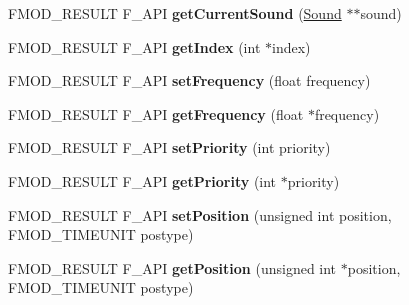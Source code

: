 \begin{DoxyCompactItemize}
\item 
\hypertarget{class_f_m_o_d_1_1_channel_af8c6cb4f1490eda077f4a661437a0809}{F\+M\+O\+D\+\_\+\+R\+E\+S\+U\+L\+T F\+\_\+\+A\+P\+I {\bfseries get\+Current\+Sound} (\hyperlink{class_f_m_o_d_1_1_sound}{Sound} $\ast$$\ast$sound)}\label{class_f_m_o_d_1_1_channel_af8c6cb4f1490eda077f4a661437a0809}

\item 
\hypertarget{class_f_m_o_d_1_1_channel_ad1d410d1d16d0c153dd0af5de8fda88e}{F\+M\+O\+D\+\_\+\+R\+E\+S\+U\+L\+T F\+\_\+\+A\+P\+I {\bfseries get\+Index} (int $\ast$index)}\label{class_f_m_o_d_1_1_channel_ad1d410d1d16d0c153dd0af5de8fda88e}

\item 
\hypertarget{class_f_m_o_d_1_1_channel_a355cd052a405c0ecdbaac7c65d24148b}{F\+M\+O\+D\+\_\+\+R\+E\+S\+U\+L\+T F\+\_\+\+A\+P\+I {\bfseries set\+Frequency} (float frequency)}\label{class_f_m_o_d_1_1_channel_a355cd052a405c0ecdbaac7c65d24148b}

\item 
\hypertarget{class_f_m_o_d_1_1_channel_a99f1dcf4b2a67f509d08f138e9e3cbca}{F\+M\+O\+D\+\_\+\+R\+E\+S\+U\+L\+T F\+\_\+\+A\+P\+I {\bfseries get\+Frequency} (float $\ast$frequency)}\label{class_f_m_o_d_1_1_channel_a99f1dcf4b2a67f509d08f138e9e3cbca}

\item 
\hypertarget{class_f_m_o_d_1_1_channel_a83a9a2f49e4bdde446f0d574847f5329}{F\+M\+O\+D\+\_\+\+R\+E\+S\+U\+L\+T F\+\_\+\+A\+P\+I {\bfseries set\+Priority} (int priority)}\label{class_f_m_o_d_1_1_channel_a83a9a2f49e4bdde446f0d574847f5329}

\item 
\hypertarget{class_f_m_o_d_1_1_channel_ae2a16710e706c0223937bc99fb3cad3d}{F\+M\+O\+D\+\_\+\+R\+E\+S\+U\+L\+T F\+\_\+\+A\+P\+I {\bfseries get\+Priority} (int $\ast$priority)}\label{class_f_m_o_d_1_1_channel_ae2a16710e706c0223937bc99fb3cad3d}

\item 
\hypertarget{class_f_m_o_d_1_1_channel_a46f8f6738b500bbb995bd4a4ecce826f}{F\+M\+O\+D\+\_\+\+R\+E\+S\+U\+L\+T F\+\_\+\+A\+P\+I {\bfseries set\+Position} (unsigned int position, F\+M\+O\+D\+\_\+\+T\+I\+M\+E\+U\+N\+I\+T postype)}\label{class_f_m_o_d_1_1_channel_a46f8f6738b500bbb995bd4a4ecce826f}

\item 
\hypertarget{class_f_m_o_d_1_1_channel_a580cb740f80cf139faaf21181490d98f}{F\+M\+O\+D\+\_\+\+R\+E\+S\+U\+L\+T F\+\_\+\+A\+P\+I {\bfseries get\+Position} (unsigned int $\ast$position, F\+M\+O\+D\+\_\+\+T\+I\+M\+E\+U\+N\+I\+T postype)}\label{class_f_m_o_d_1_1_channel_a580cb740f80cf139faaf21181490d98f}


\end{DoxyCompactItemize}
